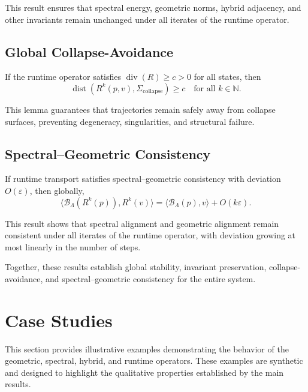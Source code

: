 \documentclass[11pt]{article}
\begin{document}
This result ensures that spectral energy, geometric norms, hybrid
adjacency, and other invariants remain unchanged under all iterates of
the runtime operator.

\subsection{Global Collapse-Avoidance}

\begin{lemma}
If the runtime operator satisfies $\operatorname{div}(R) \ge c > 0$ for
all states, then
\[
\operatorname{dist}(R^k(p,v), \Sigma_{\mathrm{collapse}}) \ge c
\quad\text{for all } k \in \mathbb{N}.
\]
\end{lemma}

This lemma guarantees that trajectories remain safely away from collapse
surfaces, preventing degeneracy, singularities, and structural failure.

\subsection{Spectral--Geometric Consistency}

\begin{lemma}
If runtime transport satisfies spectral--geometric consistency with
deviation $O(\varepsilon)$, then globally,
\[
\langle \mathcal{B}_\Lambda(R^k(p)), R^k(v) \rangle
=
\langle \mathcal{B}_\Lambda(p), v \rangle
+ O(k\varepsilon).
\]
\end{lemma}

This result shows that spectral alignment and geometric alignment remain
consistent under all iterates of the runtime operator, with deviation
growing at most linearly in the number of steps.

Together, these results establish global stability, invariant
preservation, collapse-avoidance, and spectral--geometric consistency for
the entire system.

\section{Case Studies}

This section provides illustrative examples demonstrating the behavior of
the geometric, spectral, hybrid, and runtime operators. These examples
are synthetic and designed to highlight the qualitative properties
established by the main results.
\end{document}
